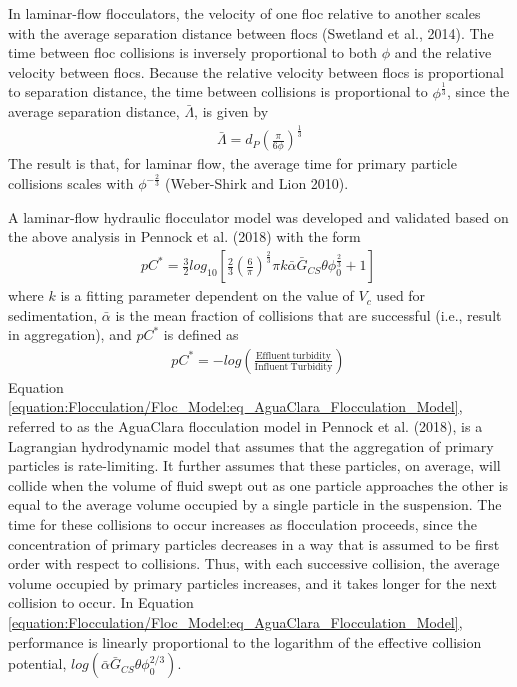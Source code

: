 \documentclass[letterpaper,10pt,english]{sphinxmanual}
\begin{document}
In laminar-flow flocculators, the velocity of one floc relative to another scales with the average separation distance between flocs (Swetland et al., 2014). The time between floc collisions is inversely proportional to both \(\phi\) and the relative velocity between flocs. Because the relative velocity between flocs is proportional to separation distance, the time between collisions is proportional to \({\phi }^{\frac{1}{3}}\), since the average separation distance, \(\bar \Lambda\), is given by
\begin{equation}\label{equation:Flocculation/Floc_Model:Flocculation/Floc_Model:16}
\begin{split}\bar \Lambda=d_{P}{\left(\frac{\pi }{6\phi }\right)}^{\frac{1}{3}}\end{split}
\end{equation}
The result is that, for laminar flow, the average time for primary particle collisions scales with \({\phi }^{-\frac{2}{3}}\) (Weber-Shirk and Lion 2010).

A laminar-flow hydraulic flocculator model was developed and validated based on the above analysis in Pennock et al. (2018) with the form
\begin{equation}\label{equation:Flocculation/Floc_Model:eq_AguaClara_Flocculation_Model}
\begin{split}pC^{*}=\frac{3}{2}{{log}_{10} \left[\frac{2}{3}{\left(\frac{6}{\pi }\right)}^{\frac{2}{3}}\pi k\bar{\alpha }\bar G_{CS}\theta {\phi }^{\frac{2}{3}}_0+1\right]\ }\end{split}
\end{equation}
where  \(k\) is a fitting parameter dependent on the value of \(V_{c}\) used for sedimentation, \(\bar{\alpha }\) is the mean fraction of collisions that are successful (i.e., result in aggregation), and \(pC^*\) is defined as
\begin{equation}\label{equation:Flocculation/Floc_Model:eq_pC_AguaClara_Flocculation_Model}
\begin{split}pC^*=-{log \left(\frac{\mathrm{Effluent\ turbidity}}{\mathrm{Influent\ Turbidity}}\right)\ }\end{split}
\end{equation}
Equation \eqref{equation:Flocculation/Floc_Model:eq_AguaClara_Flocculation_Model}, referred to as the AguaClara flocculation model in Pennock et al. (2018), is a Lagrangian hydrodynamic model that assumes that the aggregation of primary particles is rate-limiting. It further assumes that these particles, on average, will collide when the volume of fluid swept out as one particle approaches the other is equal to the average volume occupied by a single particle in the suspension. The time for these collisions to occur increases as flocculation proceeds, since the concentration of primary particles decreases in a way that is assumed to be first order with respect to collisions. Thus, with each successive collision, the average volume occupied by primary particles increases, and it takes longer for the next collision to occur. In Equation \eqref{equation:Flocculation/Floc_Model:eq_AguaClara_Flocculation_Model}, performance is linearly proportional to the logarithm of the effective collision potential, \(log(\bar{\alpha }\bar G_{CS}\theta {\phi }^{2/3}_0)\).
\end{document}
